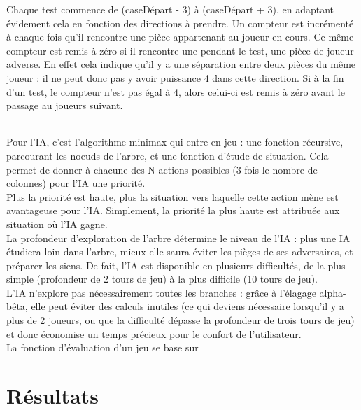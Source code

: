 \documentclass{report}
\begin{document}
	Chaque test commence de (caseDépart - 3) à (caseDépart + 3), en adaptant évidement cela en fonction des directions à prendre. Un compteur est incrémenté à chaque fois qu'il rencontre une pièce appartenant au joueur en cours. Ce même compteur est remis à zéro si il rencontre une pendant le test, une pièce de joueur adverse. En effet cela indique qu'il y a une séparation entre deux pièces du même joueur : il ne peut donc pas y avoir puissance 4 dans cette direction. 
	Si à la fin d'un test, le compteur n'est pas égal à 4, alors celui-ci est remis à zéro avant le passage au joueurs suivant.\\

        \subparagraph*{} %
        Pour l'IA, c'est l'algorithme minimax qui entre en jeu : une fonction récursive, parcourant les noeuds de l'arbre, et une fonction d'étude de situation. 
        Cela permet de donner à chacune des N actions possibles (3 fois le nombre de colonnes) pour l'IA une priorité. \\
        Plus la priorité est haute, plus la situation vers laquelle cette action mène est avantageuse pour l'IA. Simplement, la priorité la plus haute est attribuée aux situation où 
        l'IA gagne. \\
        La profondeur d'exploration de l'arbre détermine le niveau de l'IA : plus une IA étudiera loin dans l'arbre, mieux elle saura éviter les pièges de ses adversaires, et préparer
        les siens. De fait, l'IA est disponible en plusieurs difficultés, de la plus simple (profondeur de 2 tours de jeu) à la plus difficile (10 tours de jeu). \\
        L'IA n'explore pas nécessairement toutes les branches : grâce à l'élagage alpha-bêta, elle peut éviter des calculs inutiles (ce qui deviens nécessaire lorsqu'il y a plus 
        de 2 joueurs, ou que la difficulté dépasse la profondeur de trois tours de jeu) et donc économise un temps précieux pour le confort de l'utilisateur.\\
        La fonction d'évaluation d'un jeu se base sur %


\chapter{Résultats} %
\end{document}
